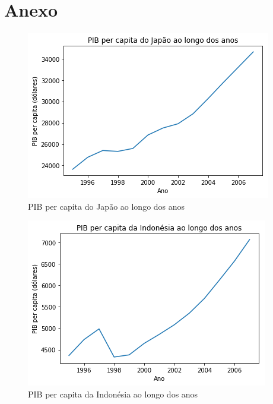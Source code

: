 \documentclass[12pt]{article}
\begin{document}
\section{Anexo}

\begin{figure}[H]
	\centering
	\includegraphics[width=\textwidth]{pib_japao.png}
	\caption{PIB per capita do Japão ao longo dos anos}
	\label{figura1}
\end{figure}

\begin{figure}[H]
	\centering
	\includegraphics[width=\textwidth]{pib_indo.png}
	\caption{PIB per capita da Indonésia ao longo dos anos}
	\label{figura2}
\end{figure}
\end{document}
